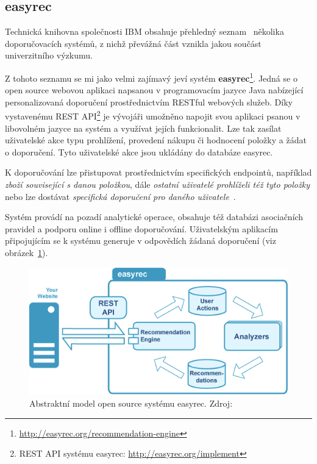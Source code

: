 \documentclass[thesis=M,czech]{FITthesis}[2014/05/07]
\begin{document}
\subsection{easyrec}
Technická knihovna společnosti IBM obsahuje přehledný seznam~\cite{ibm} několika doporučovacích systémů, z nichž převážná část vznikla jakou součást univerzitního výzkumu.

Z tohoto seznamu se mi jako velmi zajímavý jeví systém \textbf{easyrec}\footnote{\url{http://easyrec.org/recommendation-engine}}. Jedná se o open source webovou aplikaci napsanou v programovacím jazyce Java nabízející personalizovaná doporučení prostřednictvím RESTful webových služeb. Díky vystavenému REST API\footnote{REST API systému easyrec: \url{http://easyrec.org/implement}} je vývojáři umožněno napojit svou aplikaci psanou v libovolném jazyce na systém a využívat jejích funkcionalit. Lze tak zasílat uživatelské akce typu prohlížení, provedení nákupu či hodnocení položky a žádat o doporučení. Tyto uživatelské akce jsou ukládány do databáze easyrec.

K doporučování lze přistupovat prostřednictvím specifických endpointů, například \emph{zboží související s danou položkou}, dále \emph{ostatní uživatelé prohlíželi též tyto položky} nebo lze dostávat \emph{specifická doporučení pro daného uživatele}~\cite{ibm}. 

Systém provádí na pozadí analytické operace, obsahuje též databázi asociačních pravidel a podporu online i offline doporučování. Uživatelským aplikacím připojujícím se k systému generuje v odpovědích žádaná doporučení (viz obrázek~\ref{fig:easyrec}).

\begin{figure}\centering
	\includegraphics[width=1.0\textwidth]{obr/easyrec.png}
 	\caption[Abstraktní model open source systému easyrec]{Abstraktní model open source systému easyrec. Zdroj: \cite{easyrec}}\label{fig:easyrec}
\end{figure}	
\end{document}
